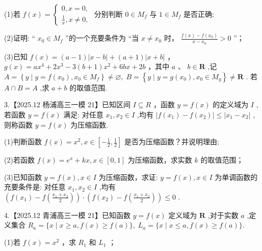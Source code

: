 \documentclass[10pt]{article}
\begin{document}
(1)若 \(f\left( x\right)  = \left\{  \begin{array}{l} 0,x = 0, \\  \frac{1}{x},x \neq  0, \end{array}\right.\) 分别判断 \(0 \in  {M}_{f}\) 与 \(1 \in  {M}_{f}\) 是否正确;

(2)证明: “ \({x}_{0} \in  {M}_{f}\) ”的一个充要条件为 “当 \(x \neq  {x}_{0}\) 时， \(\frac{f\left( x\right)  - f\left( {x}_{0}\right) }{x - {x}_{0}} > 0\) ”；

(3)已知 \(f\left( x\right)  = \left( {a - 1}\right) \left| {x - b}\right|  + \left( {a + 1}\right) \left| {x + b}\right|\) ， \(g\left( x\right)  = a{x}^{4} + 2{x}^{3} - 3\left( {b + 1}\right) {x}^{2} + {6bx} + {2b}\) ，其中 \(a\text{ 、 }b \in  \mathbf{R}\) ,记 \(A = \left\{  {y \mid  y = f\left( {x}_{0}\right) ,{x}_{0} \in  {M}_{f}}\right\}   \neq  \varnothing ,\;B = \left\{  {y \mid  y = g\left( {x}_{0}\right) ,{x}_{0} \in  {M}_{g}}\right\}   \neq  \mathbf{R}\) . 若 \(A \cap  B = A\) ,求 \(a + b\) 的取值范围.

3.【2025.12 杨浦高三一模 21】已知区间 \(I \subseteq  R\) ，函数 \(y = f\left( x\right)\) 的定义域为 \(I\) ,若函数 \(y = f\left( x\right)\) 满足: 对任意 \({x}_{1},{x}_{2} \in  I\) ,均有 \(\left| {f\left( {x}_{1}\right)  - f\left( {x}_{2}\right) }\right|  \leq  \left| {{x}_{1} - {x}_{2}}\right|\) ,则称函数 \(y = f\left( x\right)\) 为压缩函数.

(1)判断函数 \(f\left( x\right)  = {x}^{2},x \in  \left\lbrack  {-\frac{1}{2},\frac{1}{2}}\right\rbrack\) 是否为压缩函数？并说明理由;

(2)若函数 \(f\left( x\right)  = {e}^{x} + {kx},x \in  \left\lbrack  {0,1}\right\rbrack\) 为压缩函数，求实数 \(k\) 的取值范围；

(3)已知函数 \(y = f\left( x\right) ,x \in  I\) 为压缩函数，求证: \(y = f\left( x\right) ,x \in  I\) 为单调函数的充要条件是: 对任意 \({x}_{1},{x}_{2} \in  I\) ,均有 \(\left( {f\left( {x}_{1}\right)  - f\left( \frac{{x}_{1} + {x}_{2}}{2}\right) }\right)  \cdot  \left( {f\left( {x}_{2}\right)  - f\left( \frac{{x}_{1} + {x}_{2}}{2}\right) }\right)  \leq  0\) .

4.【2025.12 青浦高三一模 21】已知函数 \(y = f\left( x\right)\) 定义域为 \(\mathbf{R}\) ,对于实数 \(a\) ,定义集合 \({R}_{a} = \{ x \mid  x \geq  a,f\left( x\right)  \geq  f\left( a\right) \} ,\;{L}_{a} = \{ x \mid  x \leq  a,f\left( x\right)  \geq  f\left( a\right) \} .\)

(1)若 \(f\left( x\right)  = {x}^{2}\) ，求 \({R}_{1}\) 和 \({L}_{1}\) ；
\end{document}

